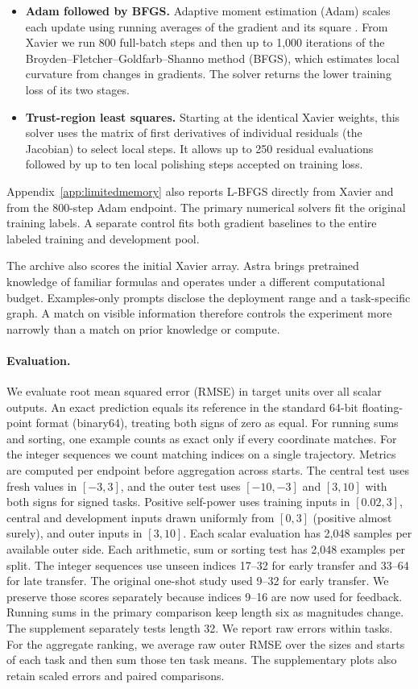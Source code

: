 \begin{itemize}
\item \textbf{Adam followed by BFGS.} Adaptive moment estimation (Adam) scales each update using running averages of the gradient and its square \cite{kingma2015adam}. From Xavier we run 800 full-batch steps and then up to 1,000 iterations of the Broyden--Fletcher--Goldfarb--Shanno method (BFGS), which estimates local curvature from changes in gradients. The solver returns the lower training loss of its two stages.
\item \textbf{Trust-region least squares.} Starting at the identical Xavier weights, this solver uses the matrix of first derivatives of individual residuals (the Jacobian) to select local steps. It allows up to 250 residual evaluations followed by up to ten local polishing steps accepted on training loss. 
\end{itemize}
Appendix~\ref{app:limitedmemory} also reports L-BFGS directly from Xavier and from the 800-step Adam endpoint. The primary numerical solvers fit the original training labels. A separate control fits both gradient baselines to the entire labeled training and development pool.

The archive also scores the initial Xavier array. Astra brings pretrained knowledge of familiar formulas and operates under a different computational budget. Examples-only prompts disclose the deployment range and a task-specific graph. A match on visible information therefore controls the experiment more narrowly than a match on prior knowledge or compute.

\paragraph{Evaluation.}
We evaluate root mean squared error (RMSE) in target units over all scalar outputs. An exact prediction equals its reference in the standard 64-bit floating-point format (binary64), treating both signs of zero as equal. For running sums and sorting, one example counts as exact only if every coordinate matches. For the integer sequences we count matching indices on a single trajectory. Metrics are computed per endpoint before aggregation across starts. The central test uses fresh values in $[-3,3]$, and the outer test uses $[-10,-3]$ and $[3,10]$ with both signs for signed tasks. Positive self-power uses training inputs in $[0.02,3]$, central and development inputs drawn uniformly from $[0,3]$ (positive almost surely), and outer inputs in $[3,10]$. Each scalar evaluation has 2,048 samples per available outer side. Each arithmetic, sum or sorting test has 2,048 examples per split. The integer sequences use unseen indices 17--32 for early transfer and 33--64 for late transfer. The original one-shot study used 9--32 for early transfer. We preserve those scores separately because indices 9--16 are now used for feedback. Running sums in the primary comparison keep length six as magnitudes change. The supplement separately tests length 32. We report raw errors within tasks. For the aggregate ranking, we average raw outer RMSE over the sizes and starts of each task and then sum those ten task means. The supplementary plots also retain scaled errors and paired comparisons.
